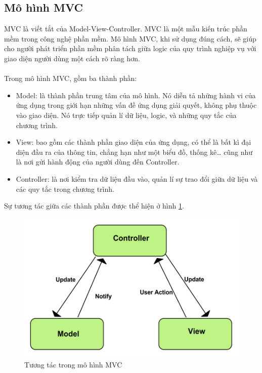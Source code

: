 \documentclass[a4paper]{article}
\begin{document}
\subsection{Mô hình MVC}
MVC là  viết tắt của Model-View-Controller. MVC là một mẫu kiến trúc phần mềm trong công nghệ phần mềm. Mô hình MVC, khi sử dụng đúng cách, sẽ giúp cho người phát triển phần mềm phân tách giữa logic của quy trình nghiệp vụ với giao diện người dùng một cách rõ ràng hơn.\\
\\
Trong mô hình MVC, gồm ba thành phần:
\begin{itemize}
    \item Model: là thành phần trung tâm của mô hình. Nó diễn tả những hành vi của ứng dụng trong giới hạn những vấn đề ứng dụng giải quyết, không phụ thuộc vào giao diện. Nó trực tiếp quản lí dữ liệu, logic, và những quy tắc của chương trình.
    \item View: bao gồm các thành phần giao diện của ứng dụng, có thể là bất kì đại diện đầu ra của thông tin, chẳng hạn như một biểu đồ, thống kê… cũng như là nơi gửi hành động của người dùng đến Controller.
    \item Controller: là nơi kiểm tra dữ liệu đầu vào, quản lí sự trao đổi giữa dữ liệu và các quy tắc trong chương trình.
\end{itemize}
Sự tương tác giữa các thành phần được thể hiện ở hình \ref{fig:mvc}.
\begin{figure}[h]
  \includegraphics[scale=0.8]{mvc}
  \centering
  \caption{Tương tác trong mô hình MVC}
  \label{fig:mvc}
\end{figure}
\end{document}
